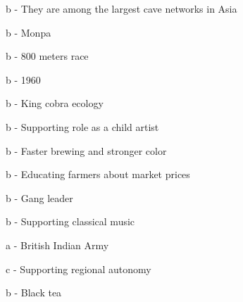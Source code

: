 \documentclass[12pt,a4paper]{book}
\begin{document}
\begin{enhancedmcq}[Question 15]{b - They are among the largest cave networks in Asia}
\end{enhancedmcq}

\begin{enhancedmcq}[Question 16]{b - Monpa}
\end{enhancedmcq}

\begin{enhancedmcq}[Question 17]{b - 800 meters race}
\end{enhancedmcq}

\begin{enhancedmcq}[Question 18]{b - 1960}
\end{enhancedmcq}

\begin{enhancedmcq}[Question 19]{b - King cobra ecology}
\end{enhancedmcq}

\begin{enhancedmcq}[Question 20]{b - Supporting role as a child artist}
\end{enhancedmcq}

\begin{enhancedmcq}[Question 21]{b - Faster brewing and stronger color}
\end{enhancedmcq}

\begin{enhancedmcq}[Question 22]{b - Educating farmers about market prices}
\end{enhancedmcq}

\begin{enhancedmcq}[Question 23]{b - Gang leader}
\end{enhancedmcq}

\begin{enhancedmcq}[Question 24]{b - Supporting classical music}
\end{enhancedmcq}

\begin{enhancedmcq}[Question 25]{a - British Indian Army}
\end{enhancedmcq}

\begin{enhancedmcq}[Question 26]{c - Supporting regional autonomy}
\end{enhancedmcq}

\begin{enhancedmcq}[Question 27]{b - Black tea}
\end{enhancedmcq}
\end{document}
